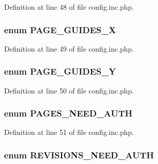 Definition at line 48 of file config.inc.php.

\hypertarget{config_8inc_8php_a81167deb206874270a59273141919fe5}{
\subsubsection[{PAGE\_\-GUIDES\_\-X}]{\setlength{\rightskip}{0pt plus 5cm}enum {\bf PAGE\_\-GUIDES\_\-X}}}
\label{config_8inc_8php_a81167deb206874270a59273141919fe5}


Definition at line 49 of file config.inc.php.

\hypertarget{config_8inc_8php_a3f78eb981e05f649bfff403c0e595d0b}{
\subsubsection[{PAGE\_\-GUIDES\_\-Y}]{\setlength{\rightskip}{0pt plus 5cm}enum {\bf PAGE\_\-GUIDES\_\-Y}}}
\label{config_8inc_8php_a3f78eb981e05f649bfff403c0e595d0b}


Definition at line 50 of file config.inc.php.

\hypertarget{config_8inc_8php_a11f5534165e1764860b16cc7215b2141}{
\subsubsection[{PAGES\_\-NEED\_\-AUTH}]{\setlength{\rightskip}{0pt plus 5cm}enum {\bf PAGES\_\-NEED\_\-AUTH}}}
\label{config_8inc_8php_a11f5534165e1764860b16cc7215b2141}


Definition at line 51 of file config.inc.php.

\hypertarget{config_8inc_8php_a67b9479d334a4e6c33c0bc3505b3eb5e}{
\subsubsection[{REVISIONS\_\-NEED\_\-AUTH}]{\setlength{\rightskip}{0pt plus 5cm}enum {\bf REVISIONS\_\-NEED\_\-AUTH}}}
\label{config_8inc_8php_a67b9479d334a4e6c33c0bc3505b3eb5e}


